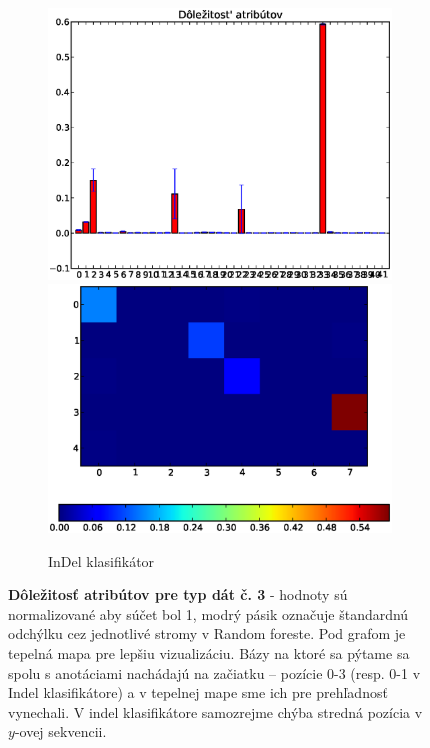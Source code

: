\begin{figure}[htp]
\begin{subfigure}[t]{0.4\textwidth}
                \includegraphics[width=\textwidth]{images/clf_fi/randomforest_fullcmp_5_indel_bars}
                \includegraphics[width=\textwidth]{images/clf_fi/randomforest_fullcmp_5_indel_heatmap}
                \caption{InDel klasifikátor}
                \label{fig:datatype3-i}
        \end{subfigure}
        \caption[Dôležitosť atribútov pre typ dát č. 3]{
        \textbf{Dôležitosť atribútov pre typ dát č. 3} - hodnoty sú normalizované aby súčet bol 1, modrý pásik označuje štandardnú odchýlku cez jednotlivé stromy v Random foreste.
        Pod grafom je tepelná mapa pre lepšiu vizualizáciu. Bázy na ktoré sa pýtame sa spolu s anotáciami nachádajú na začiatku -- pozície 0-3 (resp. 0-1 v Indel klasifikátore) a v tepelnej mape sme ich pre prehľadnosť vynechali.
        V indel klasifikátore samozrejme chýba stredná pozícia v $y$-ovej sekvencii.
        }
        \label{fig:datatype3}

\end{figure}

